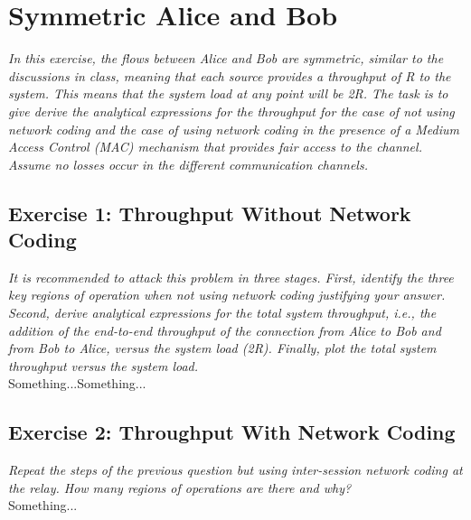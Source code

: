 \section{Symmetric Alice and Bob}
\textit{In this exercise, the flows between Alice and Bob are symmetric, similar to the discussions in class, meaning that each source provides a throughput of R to the system. This means that the system load at any point will be 2R. The task is to give derive the analytical expressions for the throughput for the case of not using network coding and the case of using network coding in the presence of a Medium Access Control (MAC) mechanism that provides fair access to the channel. Assume no losses occur in the different communication channels.}

\subsection{Exercise 1: Throughput Without Network Coding}
\textit{It is recommended to attack this problem in three stages. First, identify the three key regions of operation when not using network coding justifying your answer. Second, derive analytical expressions for the total system throughput, i.e., the addition of the end-to-end throughput of the connection from Alice to Bob and from Bob to Alice, versus the system load (2R). Finally, plot the total system throughput versus the system load.}\\

Something...Something...

\subsection{Exercise 2: Throughput With Network Coding}
\textit{Repeat the steps of the previous question but using inter-session network coding at the relay. How many regions of operations are there and why?}\\

Something...


